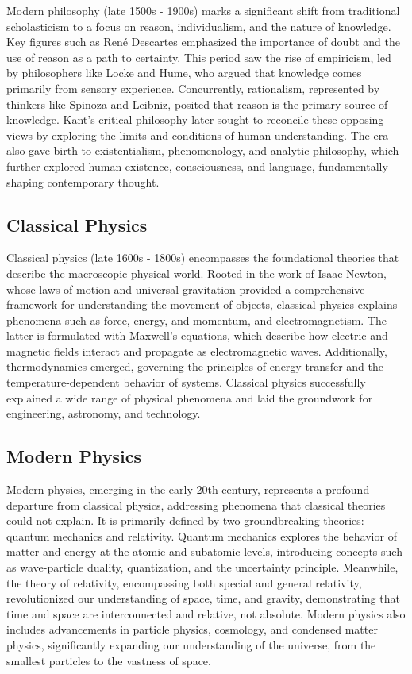 \documentclass[12pt]{article}
\begin{document}
Modern philosophy (late 1500s - 1900s) marks a significant shift from traditional scholasticism to a focus on reason, individualism, and the nature of knowledge. Key figures such as Ren\'{e} Descartes emphasized the importance of doubt and the use of reason as a path to certainty. This period saw the rise of empiricism, led by philosophers like Locke and Hume, who argued that knowledge comes primarily from sensory experience. Concurrently, rationalism, represented by thinkers like Spinoza and Leibniz, posited that reason is the primary source of knowledge. Kant's critical philosophy later sought to reconcile these opposing views by exploring the limits and conditions of human understanding. The era also gave birth to existentialism, phenomenology, and analytic philosophy, which further explored human existence, consciousness, and language, fundamentally shaping contemporary thought.

\subsection{Classical Physics}

Classical physics (late 1600s - 1800s) encompasses the foundational theories that describe the macroscopic physical world. Rooted in the work of Isaac Newton, whose laws of motion and universal gravitation provided a comprehensive framework for understanding the movement of objects, classical physics explains phenomena such as force, energy, and momentum, and electromagnetism.  The latter is formulated with Maxwell's equations, which describe how electric and magnetic fields interact and propagate as electromagnetic waves. Additionally, thermodynamics emerged, governing the principles of energy transfer and the temperature-dependent behavior of systems. Classical physics successfully explained a wide range of physical phenomena and laid the groundwork for engineering, astronomy, and technology.

\subsection{Modern Physics}

Modern physics, emerging in the early 20th century, represents a profound departure from classical physics, addressing phenomena that classical theories could not explain. It is primarily defined by two groundbreaking theories: quantum mechanics and relativity. Quantum mechanics explores the behavior of matter and energy at the atomic and subatomic levels, introducing concepts such as wave-particle duality, quantization, and the uncertainty principle. Meanwhile, the theory of relativity, encompassing both special and general relativity, revolutionized our understanding of space, time, and gravity, demonstrating that time and space are interconnected and relative, not absolute. Modern physics also includes advancements in particle physics, cosmology, and condensed matter physics, significantly expanding our understanding of the universe, from the smallest particles to the vastness of space.
\end{document}
